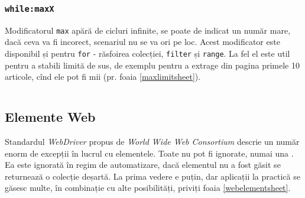 \subsubsection{\texttt{while:maxX}}

Modificatorul \texttt{max} apără de cicluri infinite, se poate de indicat un număr mare, dacă ceva va fi incorect, scenariul nu se va ori pe loc. Acest modificator este disponibil și pentru \texttt{for} - răsfoirea colecției, \texttt{filter} și \texttt{range}. La fel el este util pentru a stabili limită de sus, de exemplu pentru a extrage din pagina primele 10 articole, cînd ele pot fi mii (pr. foaia \ref{maxlimitsheet}).

\begin{sourcecode}
\label{maxlimitsheet}
\inputminted[linenos]{icl}{../sources/maxlimitsheet.icL}
\end{sourcecode}

\subsection{Elemente Web}

Standardul \textit{WebDriver} propus de \textit{World Wide Web Consortium} descrie un număr enorm de excepții în lucrul cu elementele. Toate nu pot fi ignorate, numai una . Ea este ignorată în regim de automatizare, dacă elementul nu a fost găsit se returnează o colecție deșartă. La prima vedere e puțin, dar aplicații la practică se găsesc multe, în combinație cu alte posibilități, priviți foaia \ref{webelementsheet}.

\begin{sourcecode}
\label{webelementsheet}
\inputminted[linenos]{icl}{../sources/webelementsheet.icL}
\end{sourcecode}

